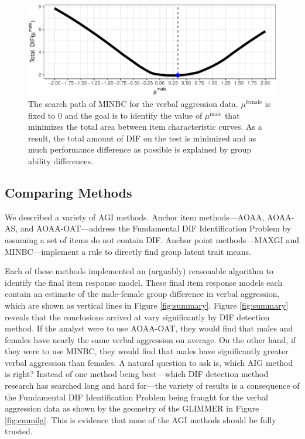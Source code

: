 \documentclass[
  english,
  man,floatsintext]{apa6}
\begin{document}
\begin{figure}[h]

{\centering \includegraphics{paper_apa_files/figure-latex/minbc-1}

}

\caption{The search path of MINBC for the verbal aggression data. $\mu^\text{female}$ is fixed to 0 and the goal is to identify the value of $\mu^\text{male}$ that minimizes the total area between item characteristic curves. As a result, the total amount of DIF on the test is minimized and as much performance difference as possible is explained by group ability differences.}\label{fig:minbc}
\end{figure}

\hypertarget{comparing-methods}{%
\subsection{Comparing Methods}\label{comparing-methods}}

We described a variety of AGI methods. Anchor item methods---AOAA, AOAA-AS, and AOAA-OAT---address the Fundamental DIF Identification Problem by assuming a set of items do not contain DIF. Anchor point methods---MAXGI and MINBC---implement a rule to directly find group latent trait means.

Each of these methods implemented an (arguably) reasonable algorithm to identify the final item response model. These final item response models each contain an estimate of the male-female group difference in verbal aggression, which are shown as vertical lines in Figure \ref{fig:summary}. Figure \ref{fig:summary} reveals that the conclusions arrived at vary significantly by DIF detection method. If the analyst were to use AOAA-OAT, they would find that males and females have nearly the same verbal aggression on average. On the other hand, if they were to use MINBC, they would find that males have significantly greater verbal aggression than females. A natural question to ask is, which AIG method is right? Instead of one method being best---which DIF detection method research has searched long and hard for---the variety of results is a consequence of the Fundamental DIF Identification Problem being fraught for the verbal aggression data as shown by the geometry of the GLIMMER in Figure \ref{fig:emmilg}. This is evidence that none of the AGI methods should be fully trusted.
\end{document}
